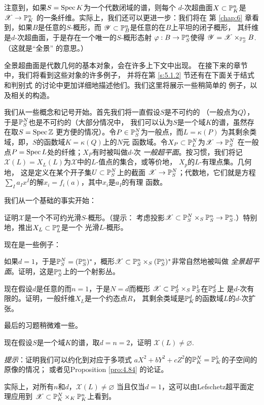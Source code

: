 注意到，如果$S=\spec K$为一个代数闭域的谱，则每个
$d$-次超曲面$X\subset \P_K^n$是$\mathscr X\to \P_K^n$
的一条纤维。实际上，我们还可以更进一步：我们将在
第 \ref{chap:6} 章看到，如果$B$是任意的$S$-概形，而
$\mathscr Y\subset \P_B^n$是任意的在$B$上平坦的闭子概形，
其纤维是$d$-次超曲面，于是存在一个唯一的$S$-概形态射
$\varphi:B\to \P_S^n$使得
$\mathscr Y=\mathscr X\times_{\P_S^n}B$. （这就是“全景”
的意思。）

全景超曲面是代数几何的基本对象，会在许多上下文中出现。
在接下来的章节中，我们将看到这些对象的许多例子，
并将在第 \ref{s:5.1.2} 节还有在下面关于结式和判别式
的讨论中更加详细地描述他们。我们这里将展示一些稍简单的
例子，以及相关的构造。

我们从一些概念和记号开始。首先我们将一直假设$S$是不可约的
（一般点为$Q$），于是$\P_S^N$也是不可约的（大部分情况中，
我们可以认为$S$是一个域$K$的谱，虽然存在取$S=\spec \zz$
更方便的情况）。令$P\in \P_S^N$为一般点，而$L=\kappa(P)$
为其剩余类域，即，$S$的函数域$K=\kappa(Q)$上的$N$元
函数域。令$X_P\subset \P_L^N$为$\mathscr X\to \P_S^N$
在一般点$P=\spec L$处的纤维；$X_P$有时被叫做$d$-次
\textit{一般超平面}。按习惯，我们将记$\mathscr X(L)
=X_L(L)$为$\mathscr X$中的$L$-值点的集合，或等价地，
$X_p$的$L$-有理点集。几何地，%
这是定义在某个开子集$U\subset \P_S^N$上的截面
$\mathscr X\to \P_S^N$；代数地，它们就是方程
$\sum_I a_Ix^I$的解$x_i=f_i(a)$，其中$x_i$是$a_I$的有理
函数。

我们从一个基础的事实开始：

\begin{exe}\label{exe:3.51}
证明$\mathscr X$是一个不可约光滑$S$-概形。（提示：
考虑投影$\mathscr X\subset \P_S^N\times_S \P_S^n
\to \P_S^n$.）特别地，推出$X_L\subset \P^n_L$是一个
光滑$L$-概形。
\end{exe}

现在是一些例子：

\begin{exe}\label{exe:3.52}
如果$d=1$，于是$\P_S^N=(\P^n_S)^*$，概形$\mathscr X
\subset \P_S^n\times_S (\P^n_S)^*$非常自然地被叫做
\textit{全景超平面}。证明，这是$\P_S^n$上的一个射影丛。
\end{exe}

\begin{exe}\label{exe:3.53}
现在假设$d$是任意的而$n=1$，于是$N=d$而概形
$\mathscr X\subset \P_S^d\times_S \P^1_S$在$\P_S^d$上
是$d$-次有限的。证明，一般纤维$X_L$是一个约态点$R$，
其剩余类域是$\P_K^d$的函数域$L$的$d$-次扩张。
\end{exe}

最后的习题稍微难一些。

\begin{exe}\label{exe:3.54}
现在假设$S$是一个域$K$的谱，取$d=n=2$，证明
$\mathscr X(L)\neq \varnothing$.

\textit{提示}：证明我们可以约化到对应于多项式
$aX^2+bY^2+cZ^2$的$\P^N_K=\P^5_K$的子空间的原像的情况；
或者见Proposition \ref{pro:4.84} 的论证。
\end{exe}

实际上，对所有$n$和$d$，$\mathscr X(L)\neq \varnothing$
当且仅当$d=1$，这可以由Lefschetz超平面定理应用到
$\mathscr X\subset \P_K^N\times_K \P_K^n$上看到。
